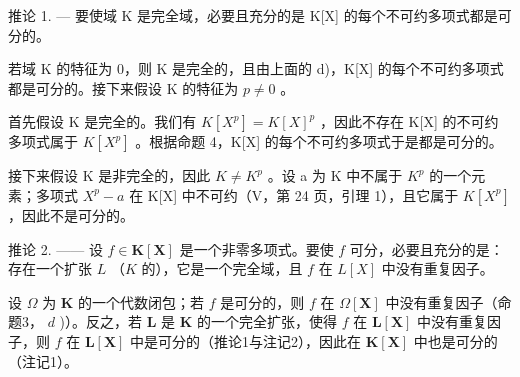 推论 1. --- 要使域 K 是完全域，必要且充分的是 K{[}X{]} 的每个不可约多项式都是可分的。

若域 K 的特征为 0，则 K 是完全的，且由上面的 d)，K{[}X{]} 的每个不可约多项式都是可分的。接下来假设 K 的特征为 \(p \neq 0\) 。

首先假设 K 是完全的。我们有 \(K[X^{p}] = K[X]^{p}\) ，因此不存在 K{[}X{]} 的不可约多项式属于 \(K[X^{p}]\) 。根据命题 4，K{[}X{]} 的每个不可约多项式于是都是可分的。

接下来假设 K 是非完全的，因此 \(K \neq K^{p}\) 。设 a 为 K 中不属于 \(K^{p}\) 的一个元素；多项式 \(X^{p} - a\) 在 K{[}X{]} 中不可约（V，第 24 页，引理 1），且它属于 \(K[X^{p}]\) ，因此不是可分的。

推论 2. —— 设 \(f \in \mathbf{K}[\mathbf{X}]\) 是一个非零多项式。要使 \(f\) 可分，必要且充分的是：存在一个扩张 \(L\) （\(K\) 的），它是一个完全域，且 \(f\) 在 \(L[X]\) 中没有重复因子。

设 \(\Omega\) 为 \(\mathbf{K}\) 的一个代数闭包；若 \(f\) 是可分的，则 \(f\) 在 \(\Omega[\mathbf{X}]\) 中没有重复因子（命题3， \(d\) )）。反之，若 \(\mathbf{L}\) 是 \(\mathbf{K}\) 的一个完全扩张，使得 \(f\) 在 \(\mathbf{L}[\mathbf{X}]\) 中没有重复因子，则 \(f\) 在 \(\mathbf{L}[\mathbf{X}]\) 中是可分的（推论1与注记2），因此在 \(\mathbf{K}[\mathbf{X}]\) 中也是可分的（注记1）。


